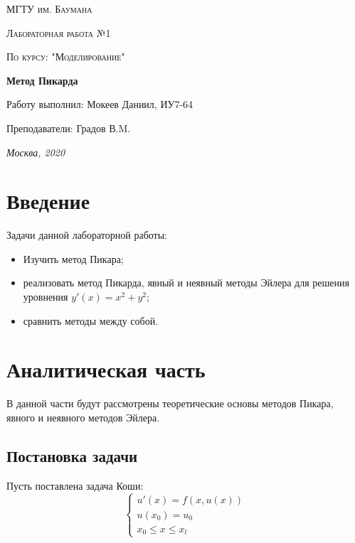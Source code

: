 \documentclass[12pt]{report}
\begin{document}
\begin{titlepage}
	\centering
	{\scshape\LARGE МГТУ им. Баумана \par}
	\vspace{3cm}
	{\scshape\Large Лабораторная работа №1\par}
	\vspace{0.5cm}	
	{\scshape\Large По курсу: "Моделирование"\par}
	\vspace{1.5cm}
	{\huge\bfseries Метод Пикарда\par}
	\vspace{2cm}
	\Large Работу выполнил: Мокеев Даниил, ИУ7-64\par
	\vspace{0.5cm}
	\Large Преподаватели:  Градов В.M.\par

	\vfill
	\large \textit {Москва, 2020} \par
\end{titlepage}

\tableofcontents

\newpage
\chapter*{Введение}

Задачи данной лабораторной работы:
\begin{itemize}
	\item Изучить метод Пикара;
	\item реализовать метод Пикарда, явный и неявный методы Эйлера для решения уровнения $y'(x) = x^2 + y^2$;
	\item сравнить методы между собой.
\end{itemize}


\chapter{Аналитическая часть}
В данной части будут рассмотрены теоретические основы методов Пикара, явного и неявного методов Эйлера. 

\section{Постановка задачи} 
Пусть поставлена задача Коши:
\begin{equation*}
	\begin{cases}
	u'(x) = f(x, u(x))\\
	u(x_0) = u_0 \\
	x_0 \leq x \leq x_l
	\end{cases}
\end{equation*}
\end{document}
